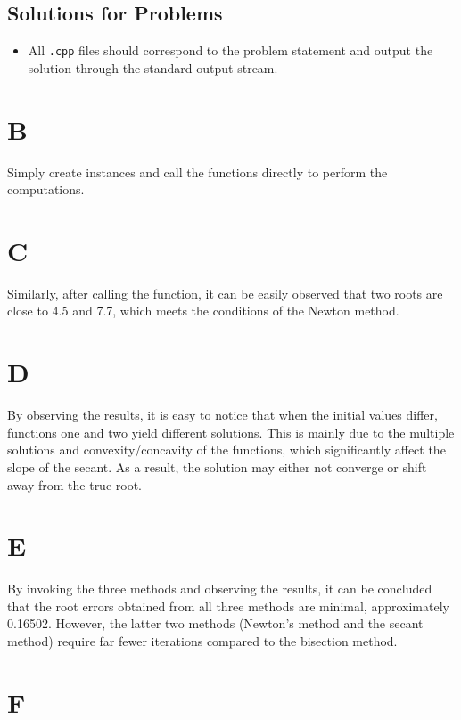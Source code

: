 \documentclass[a4paper]{article}
\begin{document}
\subsection*{Solutions for Problems}
\begin{itemize}
    \item All \texttt{.cpp} files should correspond to the problem statement and output the solution through the standard output stream.
\end{itemize}

\section*{B}

Simply create instances and call the functions directly to perform the computations.

\section*{C}

Similarly, after calling the function, it can be easily observed that two roots are close to 4.5 and 7.7, which meets the conditions of the Newton method.

\section*{D}

By observing the results, it is easy to notice that when the initial values differ, functions one and two yield different solutions. 
This is mainly due to the multiple solutions and convexity/concavity of the functions, which significantly affect the slope of the secant. 
As a result, the solution may either not converge or shift away from the true root.

\section*{E}

By invoking the three methods and observing the results, it can be concluded that the root errors obtained from all three methods are minimal, approximately 0.16502. 
However, the latter two methods (Newton's method and the secant method) require far fewer iterations compared to the bisection method.

\section*{F}
\end{document}
